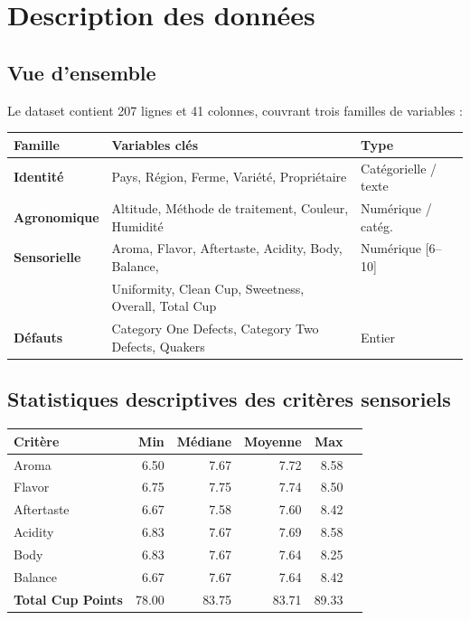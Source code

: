 \documentclass[12pt,a4paper]{article}
\begin{document}
\section{Description des données}

\subsection{Vue d'ensemble}

Le dataset contient 207 lignes et 41 colonnes, couvrant trois familles de variables :

\begin{center}
\begin{tabular}{@{}lll@{}}
\toprule
\rowcolor{coffeecream}
\textbf{Famille} & \textbf{Variables clés} & \textbf{Type} \\
\midrule
\textbf{Identité} & Pays, Région, Ferme, Variété, Propriétaire & Catégorielle / texte \\
\textbf{Agronomique} & Altitude, Méthode de traitement, Couleur, Humidité & Numérique / catég. \\
\textbf{Sensorielle} & Aroma, Flavor, Aftertaste, Acidity, Body, Balance, & Numérique [6--10] \\
& Uniformity, Clean Cup, Sweetness, Overall, Total Cup & \\
\textbf{Défauts} & Category One Defects, Category Two Defects, Quakers & Entier \\
\bottomrule
\end{tabular}
\end{center}

\subsection{Statistiques descriptives des critères sensoriels}

\begin{center}
\begin{tabular}{@{}lrrrrr@{}}
\toprule
\rowcolor{coffeecream}
\textbf{Critère} & \textbf{Min} & \textbf{Médiane} & \textbf{Moyenne} & \textbf{Max} \\
\midrule
Aroma        & 6.50 & 7.67 & 7.72 & 8.58 \\
Flavor       & 6.75 & 7.75 & 7.74 & 8.50 \\
Aftertaste   & 6.67 & 7.58 & 7.60 & 8.42 \\
Acidity      & 6.83 & 7.67 & 7.69 & 8.58 \\
Body         & 6.83 & 7.67 & 7.64 & 8.25 \\
Balance      & 6.67 & 7.67 & 7.64 & 8.42 \\
\midrule
\textbf{Total Cup Points} & 78.00 & 83.75 & 83.71 & 89.33 \\
\bottomrule
\end{tabular}
\end{center}
\end{document}
